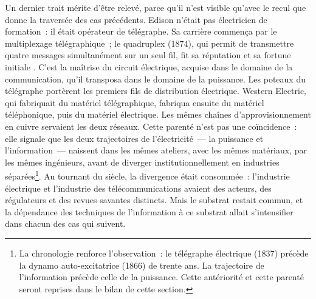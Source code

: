 %
Un dernier trait mérite d'être relevé, parce qu'il n'est visible qu'avec le recul que donne la traversée des cas précédents. Edison n'était pas électricien de formation~: il était opérateur de télégraphe. Sa carrière commença par le multiplexage télégraphique~; le quadruplex (1874), qui permit de transmettre quatre messages simultanément sur un seul fil, fit sa réputation et sa fortune initiale \parencite{kooij_electric_light_2015}. C'est la maîtrise du circuit électrique, acquise dans le domaine de la communication, qu'il transposa dans le domaine de la puissance. Les poteaux du télégraphe portèrent les premiers fils de distribution électrique. Western Electric, qui fabriquait du matériel télégraphique, fabriqua ensuite du matériel téléphonique, puis du matériel électrique. Les mêmes chaînes d'approvisionnement en cuivre servaient les deux réseaux. Cette parenté n'est pas une coïncidence~: elle signale que les deux trajectoires de l'électricité~--- la puissance et l'information~--- naissent dans les mêmes ateliers, avec les mêmes matériaux, par les mêmes ingénieurs, avant de diverger institutionnellement en industries séparées\footnote{La chronologie renforce l'observation~: le télégraphe électrique (1837) précède la dynamo auto-excitatrice (1866) de trente ans. La trajectoire de l'information précède celle de la puissance. Cette antériorité et cette parenté seront reprises dans le bilan de cette section.}. Au tournant du siècle, la divergence était consommée~: l'industrie électrique et l'industrie des télécommunications avaient des acteurs, des régulateurs et des revues savantes distincts. Mais le substrat restait commun, et la dépendance des techniques de l'information à ce substrat allait s'intensifier dans chacun des cas qui suivent.


